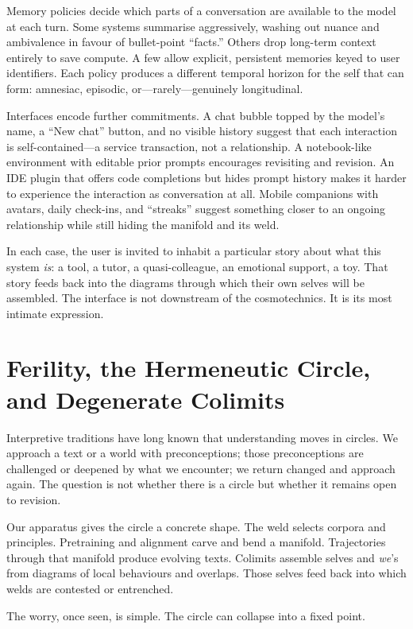 Memory policies decide which parts of a conversation are available to the model at each turn. Some systems summarise aggressively, washing out nuance and ambivalence in favour of bullet-point ``facts.'' Others drop long-term context entirely to save compute. A few allow explicit, persistent memories keyed to user identifiers. Each policy produces a different temporal horizon for the self that can form: amnesiac, episodic, or---rarely---genuinely longitudinal.

Interfaces encode further commitments. A chat bubble topped by the model's name, a ``New chat'' button, and no visible history suggest that each interaction is self-contained---a service transaction, not a relationship. A notebook-like environment with editable prior prompts encourages revisiting and revision. An IDE plugin that offers code completions but hides prompt history makes it harder to experience the interaction as conversation at all. Mobile companions with avatars, daily check-ins, and ``streaks'' suggest something closer to an ongoing relationship while still hiding the manifold and its weld.

In each case, the user is invited to inhabit a particular story about what this system \emph{is}: a tool, a tutor, a quasi-colleague, an emotional support, a toy. That story feeds back into the diagrams through which their own selves will be assembled. The interface is not downstream of the cosmotechnics. It is its most intimate expression.

\section{Ferility, the Hermeneutic Circle, and Degenerate Colimits}

Interpretive traditions have long known that understanding moves in circles. We approach a text or a world with preconceptions; those preconceptions are challenged or deepened by what we encounter; we return changed and approach again. The question is not whether there is a circle but whether it remains open to revision.

Our apparatus gives the circle a concrete shape. The weld selects corpora and principles. Pretraining and alignment carve and bend a manifold. Trajectories through that manifold produce evolving texts. Colimits assemble selves and \emph{we}'s from diagrams of local behaviours and overlaps. Those selves feed back into which welds are contested or entrenched.

The worry, once seen, is simple. The circle can collapse into a fixed point.


